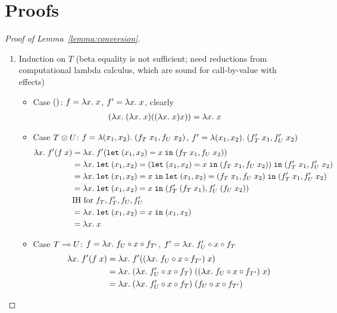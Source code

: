 
\section{Proofs}
\label{sec:properties}

\begin{proof}[Proof of Lemma~\ref{lemma:conversion}]
  \begin{enumerate}
  \item Induction on $T$ (beta equality is not sufficient; need
    reductions from computational lambda calculus, which are sound for
    call-by-value with effects)
    \begin{itemize}
    \item Case $()$: $f = \lambda x.\; x$, $f' = \lambda x.\; x$, clearly
      \begin{align*}
        (\lambda x.\; (\lambda x.\; x) ((\lambda x.\; x) x)) &= \lambda x.\; x
      \end{align*}
    \item Case $T \otimes U$: $f = \lambda (x_1,x_2).\; (f_T \; x_1, f_U \;
      x_2)$, $f' = \lambda (x_1,x_2).\; (f'_T \; x_1, f'_U \; x_2)$
      \begin{align*}
        \lambda x.\; f' (f\; x)
        &= \lambda x.\; f' (\mathtt{let}\; (x_1,x_2) = x \;\mathtt{in}\; (f_T \; x_1, f_U \; x_2)) \\
        &= \lambda x.\; \mathtt{let}\; (x_1,x_2) =  (\mathtt{let}\; (x_1,x_2) = x \;\mathtt{in}\; (f_T \; x_1,
          f_U \; x_2)) \;\mathtt{in}\;  (f'_T \; x_1, f'_U \; x_2)\\
        &= \lambda x.\;
          \mathtt{let}\; (x_1,x_2) = x \;\mathtt{in}\; \mathtt{let}\; (x_1,x_2) =  (f_T \; x_1,
          f_U \; x_2) \;\mathtt{in}\;  (f'_T \; x_1, f'_U \; x_2)\\
        &= \lambda x.\;
          \mathtt{let}\; (x_1,x_2) = x \;\mathtt{in}\;  (f'_T \; (f_T\; x_1), f'_U \; (f_U\;
          x_2))\\
        & \text{IH for }f_T, f_T', f_U, f_U' \\
        &= \lambda x.\;
          \mathtt{let}\; (x_1,x_2) = x \;\mathtt{in}\;  (x_1,x_2)\\
        &= \lambda x.\; x
      \end{align*}
    \item Case $T \multimap U$: $f = \lambda x.\; f_U \circ x \circ f_{T'}$, $f'
      = \lambda x.\; f'_U \circ x \circ f_T$
      \begin{align*}
        \ELam x f' (f\; x)
        &= \ELam x f' ((\ELam x f_U \circ x \circ f_{T'})\; x) \\
        &= \ELam x (\ELam x f'_U \circ x \circ f_T)\; ((\ELam x f_U \circ x \circ f_{T'})\; x) \\
        &= \ELam x (\ELam x f'_U \circ x \circ f_T)\; (f_U \circ x \circ f_{T'}) \\

\end{align*}
\end{itemize}
\end{enumerate}
\end{proof}
